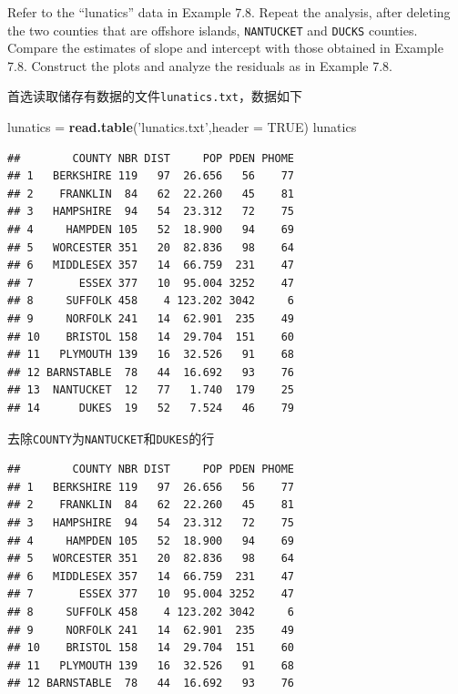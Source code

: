 \documentclass[]{article}
\newenvironment{Shaded}{\begin{snugshade}}{\end{snugshade}}
\newcommand{\DataTypeTok}[1]{\textcolor[rgb]{0.13,0.29,0.53}{#1}}
\newcommand{\KeywordTok}[1]{\textcolor[rgb]{0.13,0.29,0.53}{\textbf{#1}}}
\newcommand{\NormalTok}[1]{#1}
\newcommand{\OperatorTok}[1]{\textcolor[rgb]{0.81,0.36,0.00}{\textbf{#1}}}
\newcommand{\OtherTok}[1]{\textcolor[rgb]{0.56,0.35,0.01}{#1}}
\newcommand{\StringTok}[1]{\textcolor[rgb]{0.31,0.60,0.02}{#1}}
\begin{document}
Refer to the ``lunatics'' data in Example 7.8. Repeat the analysis,
after deleting the two counties that are offshore islands,
\texttt{NANTUCKET} and \texttt{DUCKS} counties. Compare the estimates of
slope and intercept with those obtained in Example 7.8. Construct the
plots and analyze the residuals as in Example 7.8.

首选读取储存有数据的文件\texttt{lunatics.txt}，数据如下

\begin{Shaded}
\begin{Highlighting}[]
\NormalTok{lunatics =}\StringTok{ }\KeywordTok{read.table}\NormalTok{(}\StringTok{'lunatics.txt'}\NormalTok{,}\DataTypeTok{header =} \OtherTok{TRUE}\NormalTok{)}
\NormalTok{lunatics}
\end{Highlighting}
\end{Shaded}

\begin{verbatim}
##        COUNTY NBR DIST     POP PDEN PHOME
## 1   BERKSHIRE 119   97  26.656   56    77
## 2    FRANKLIN  84   62  22.260   45    81
## 3   HAMPSHIRE  94   54  23.312   72    75
## 4     HAMPDEN 105   52  18.900   94    69
## 5   WORCESTER 351   20  82.836   98    64
## 6   MIDDLESEX 357   14  66.759  231    47
## 7       ESSEX 377   10  95.004 3252    47
## 8     SUFFOLK 458    4 123.202 3042     6
## 9     NORFOLK 241   14  62.901  235    49
## 10    BRISTOL 158   14  29.704  151    60
## 11   PLYMOUTH 139   16  32.526   91    68
## 12 BARNSTABLE  78   44  16.692   93    76
## 13  NANTUCKET  12   77   1.740  179    25
## 14      DUKES  19   52   7.524   46    79
\end{verbatim}

去除\texttt{COUNTY}为\texttt{NANTUCKET}和\texttt{DUKES}的行

\begin{Shaded}
\end{Shaded}

\begin{verbatim}
##        COUNTY NBR DIST     POP PDEN PHOME
## 1   BERKSHIRE 119   97  26.656   56    77
## 2    FRANKLIN  84   62  22.260   45    81
## 3   HAMPSHIRE  94   54  23.312   72    75
## 4     HAMPDEN 105   52  18.900   94    69
## 5   WORCESTER 351   20  82.836   98    64
## 6   MIDDLESEX 357   14  66.759  231    47
## 7       ESSEX 377   10  95.004 3252    47
## 8     SUFFOLK 458    4 123.202 3042     6
## 9     NORFOLK 241   14  62.901  235    49
## 10    BRISTOL 158   14  29.704  151    60
## 11   PLYMOUTH 139   16  32.526   91    68
## 12 BARNSTABLE  78   44  16.692   93    76
\end{verbatim}
\end{document}
